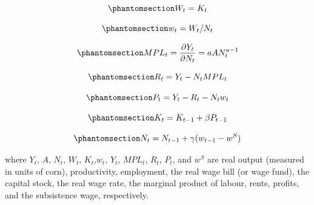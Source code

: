 \documentclass[
  letterpaper,
  DIV=11,
  numbers=noendperiod]{scrreprt}
\begin{document}
\begin{equation}\phantomsection\label{eq-ricardo1_W}{
W_t=K_t
}\end{equation}

\begin{equation}\phantomsection\label{eq-ricardo1_w}{
w_t =W_t/N_t
}\end{equation}

\begin{equation}\phantomsection\label{eq-ricardo1_MPL}{
MPL_t =\frac{\partial Y_t}{\partial N_t} =aAN_t^{a-1}
}\end{equation}

\begin{equation}\phantomsection\label{eq-ricardo1_R}{
R_t = Y_t - N_tMPL_t 
}\end{equation}

\begin{equation}\phantomsection\label{eq-ricardo1_P}{
P_t = Y_t - R_t - N_tw_t
}\end{equation}

\begin{equation}\phantomsection\label{eq-ricardo1_K}{
K_t = K_{t-1} + \beta P_{t-1} 
}\end{equation}

\begin{equation}\phantomsection\label{eq-ricardo1_N}{
N_t = N_{t-1} + \gamma (w_{t-1} - w^S)
}\end{equation}

where \(Y_t\), \(A\), \(N_t\), \(W_t\), \(K_t\),\(w_t\), \(Y_t\),
\(MPL_t\), \(R_t\), \(P_t\), and \(w^S\) are real output (measured in
units of corn), productivity, employment, the real wage bill (or wage
fund), the capital stock, the real wage rate, the marginal product of
labour, rents, profits, and the subsistence wage, respectively.
\end{document}
